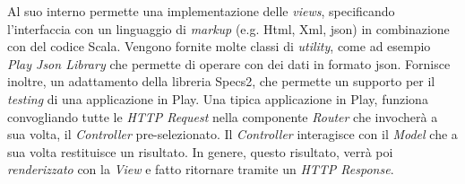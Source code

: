 Al suo interno permette una implementazione delle \emph{views}, specificando l'interfaccia con un linguaggio di \emph{markup} (e.g. Html, Xml, \gls{json}) in combinazione con del codice Scala. Vengono fornite molte classi di \emph{utility}, come ad esempio \emph{Play Json Library} che permette di operare con dei dati in formato \gls{json}. Fornisce inoltre, un adattamento della libreria Specs2, che permette un supporto per il \emph{testing} di una applicazione in Play. Una tipica applicazione in Play, funziona convogliando tutte le \emph{HTTP Request} nella componente \emph{Router} che invocherà a sua volta, il \emph{Controller} pre-selezionato. Il \emph{Controller} interagisce con il \emph{Model} che a sua volta restituisce un risultato. In genere, questo risultato, verrà poi \emph{renderizzato} con la \emph{View} e fatto ritornare tramite un \emph{HTTP Response}.

